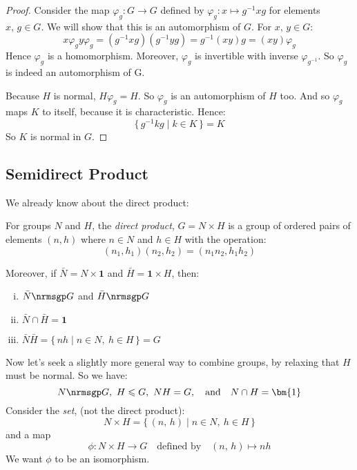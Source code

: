 \begin{proof}
    Consider the map \(\varphi_g:G \to G\) defined by \(\varphi_g:x \mapsto g^{-1}xg\) for elements \(x,\,g \in G\).
    We will show that this is an automorphism of \(G\).
    For \(x,\,y \in G\):
    \[x\varphi_g y\varphi_g = (g^{-1}xg)(g^{-1}yg) = g^{-1}(xy)g = (xy)\varphi_g\]
    Hence \(\varphi_g\) is a homomorphism.
    Moreover, \(\varphi_g\) is invertible with inverse \(\varphi_{g^{-1}}\).
    So \(\varphi_g\) is indeed an automorphism of G.

    Because \(H\) is normal, \(H\varphi_g = H\).
    So \(\varphi_g\) is an automorphism of \(H\) too.
    And so \(\varphi_g\) maps \(K\) to itself, because it is characteristic.
    Hence:
    \[\{\,g^{-1}kg \mid k \in K\,\} = K\]
    So \(K\) is normal in \(G\).
\end{proof}

\subsection{Semidirect Product}
We already know about the direct product:

\begin{definition}
    For groups \(N\) and \(H\), the \emph{direct product}, \(G = N\times H\) is a group of ordered pairs of elements
    \((n, h)\) where \(n \in N\) and \(h \in H\) with the operation:
    \[(n_1, h_1)(n_2, h_2) = (n_1n_2, h_1h_2)\]

    Moreover, if \(\bar{N} = N \times \bm{1}\) and \(\bar{H} = \bm{1} \times H\), then:
    \begin{enumerate}[(i)]
        \item \(\bar{N} \nrmsgp G\) and \(\bar{H} \nrmsgp G\)
        \item \(\bar{N} \cap \bar{H} = \bm{1}\)
        \item \(\bar{N}\bar{H} = \{\,nh \mid n \in N,\ h \in H\,\} = G\)
    \end{enumerate}
\end{definition}

Now let's seek a slightly more general way to combine groups, by relaxing that \(H\) must be normal.
So we have:
\[N \nrmsgp G,\ H \leqslant G,\ NH = G, \quad \text{and} \quad N \cap H = \bm{1}\]
Consider the \emph{set}, (not the direct product):
\[N \times H = \{\,(n,\,h) \mid n \in N,\ h \in H\,\}\]
and a map
\[\phi:N \times H \to G \quad \text{defined by} \quad (n,\, h) \mapsto nh\]
We want \(\phi\) to be an isomorphism.

